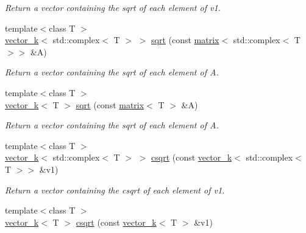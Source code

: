 \begin{DoxyCompactItemize}
\begin{DoxyCompactList}\small\item\em Return a vector containing the sqrt of each element of v1. \end{DoxyCompactList}\item 
\hypertarget{namespacekeycpp_ae5bcff39b329c05d8feded07f03c211e}{{\footnotesize template$<$class T $>$ }\\\hyperlink{classkeycpp_1_1vector__k}{vector\-\_\-k}$<$ std\-::complex$<$ T $>$ $>$ \hyperlink{namespacekeycpp_ae5bcff39b329c05d8feded07f03c211e}{sqrt} (const \hyperlink{classkeycpp_1_1matrix}{matrix}$<$ std\-::complex$<$ T $>$$>$ \&A)}\label{namespacekeycpp_ae5bcff39b329c05d8feded07f03c211e}

\begin{DoxyCompactList}\small\item\em Return a vector containing the sqrt of each element of A. \end{DoxyCompactList}\item 
\hypertarget{namespacekeycpp_a9238ebdadb19806695736975e6dcdf4c}{{\footnotesize template$<$class T $>$ }\\\hyperlink{classkeycpp_1_1vector__k}{vector\-\_\-k}$<$ T $>$ \hyperlink{namespacekeycpp_a9238ebdadb19806695736975e6dcdf4c}{sqrt} (const \hyperlink{classkeycpp_1_1matrix}{matrix}$<$ T $>$ \&A)}\label{namespacekeycpp_a9238ebdadb19806695736975e6dcdf4c}

\begin{DoxyCompactList}\small\item\em Return a vector containing the sqrt of each element of A. \end{DoxyCompactList}\item 
\hypertarget{namespacekeycpp_a9642e67bdae5228a94fca58334c8f812}{{\footnotesize template$<$class T $>$ }\\\hyperlink{classkeycpp_1_1vector__k}{vector\-\_\-k}$<$ std\-::complex$<$ T $>$ $>$ \hyperlink{namespacekeycpp_a9642e67bdae5228a94fca58334c8f812}{csqrt} (const \hyperlink{classkeycpp_1_1vector__k}{vector\-\_\-k}$<$ std\-::complex$<$ T $>$$>$ \&v1)}\label{namespacekeycpp_a9642e67bdae5228a94fca58334c8f812}

\begin{DoxyCompactList}\small\item\em Return a vector containing the csqrt of each element of v1. \end{DoxyCompactList}\item 
\hypertarget{namespacekeycpp_ad5290a246f96df2efa1ffc0f80685478}{{\footnotesize template$<$class T $>$ }\\\hyperlink{classkeycpp_1_1vector__k}{vector\-\_\-k}$<$ T $>$ \hyperlink{namespacekeycpp_ad5290a246f96df2efa1ffc0f80685478}{csqrt} (const \hyperlink{classkeycpp_1_1vector__k}{vector\-\_\-k}$<$ T $>$ \&v1)}\label{namespacekeycpp_ad5290a246f96df2efa1ffc0f80685478}


\end{DoxyCompactItemize}
